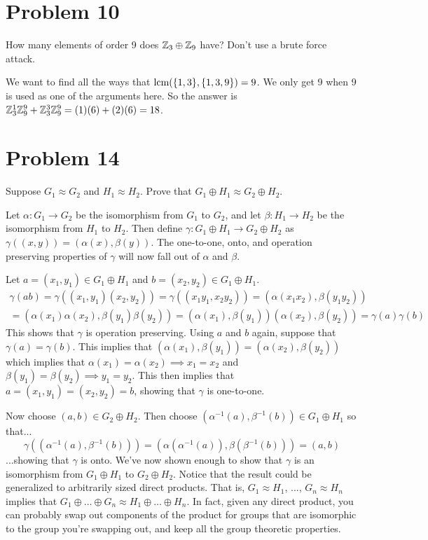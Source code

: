 \documentclass{article}
\begin{document}
\section*{Problem 10}

How many elements of order 9 does $\mathbb{Z}_3\oplus \mathbb{Z}_9$ have?  Don't use a
brute force attack.

We want to find all the ways that $\mbox{lcm}(\{1,3\},\{1,3,9\})=9$.
We only get 9 when 9 is used as one of the arguments here.
So the answer is $\mathbb{Z}_3^1 \mathbb{Z}_9^9 + \mathbb{Z}_3^3 \mathbb{Z}_9^9 = (1)(6)+(2)(6)=18$.

\section*{Problem 14}

Suppose $G_1\approx G_2$ and $H_1\approx H_2$.  Prove that
$G_1\oplus H_1\approx G_2\oplus H_2$.

Let $\alpha:G_1\to G_2$ be the isomorphism from $G_1$ to $G_2$, and
let $\beta:H_1\to H_2$ be the isomorphism from $H_1$ to $H_2$.
Then define $\gamma:G_1\oplus H_1\to G_2\oplus H_2$ as
$\gamma((x,y))=(\alpha(x),\beta(y))$.  The one-to-one, onto, and
operation preserving properties of $\gamma$ will now fall out of
$\alpha$ and $\beta$.

Let $a=(x_1,y_1)\in G_1\oplus H_1$ and $b=(x_2,y_2)\in G_1\oplus H_1$.
\begin{multline*}
\gamma(ab) = \gamma((x_1,y_1)(x_2,y_2)) = \gamma((x_1y_1,x_2y_2))
 = (\alpha(x_1x_2),\beta(y_1y_2)) \\
 = (\alpha(x_1)\alpha(x_2),\beta(y_1)\beta(y_2))
 = (\alpha(x_1),\beta(y_1))(\alpha(x_2),\beta(y_2)) = \gamma(a)\gamma(b)
\end{multline*}
This shows that $\gamma$ is operation preserving.  Using $a$ and $b$ again,
suppose that $\gamma(a)=\gamma(b)$.  This implies that
$(\alpha(x_1),\beta(y_1))=(\alpha(x_2),\beta(y_2))$ which implies that
$\alpha(x_1)=\alpha(x_2)\implies x_1=x_2$ and $\beta(y_1)=\beta(y_2)\implies y_1=y_2$.
This then implies that $a=(x_1,y_1)=(x_2,y_2)=b$, showing that $\gamma$
is one-to-one.

Now choose $(a,b)\in G_2\oplus H_2$.  Then choose $(\alpha^{-1}(a),\beta^{-1}(b))\in G_1\oplus H_1$
so that...
\begin{equation*}
\gamma((\alpha^{-1}(a),\beta^{-1}(b))) = (\alpha(\alpha^{-1}(a)),\beta(\beta^{-1}(b)))
 = (a,b)
\end{equation*}
...showing that $\gamma$ is onto.  We've now shown enough to show that
$\gamma$ is an isomorphism from $G_1\oplus H_1$ to $G_2\oplus H_2$.
Notice that the result could be generalized to arbitrarily sized direct products.
That is, $G_1\approx H_1$, ..., $G_n\approx H_n$ implies that
$G_1\oplus\dots\oplus G_n\approx H_1\oplus\dots\oplus H_n$.  In fact,
given any direct product, you can probably swap out components of the
product for groups that are isomorphic to the group you're swapping out,
and keep all the group theoretic properties.
\end{document}
